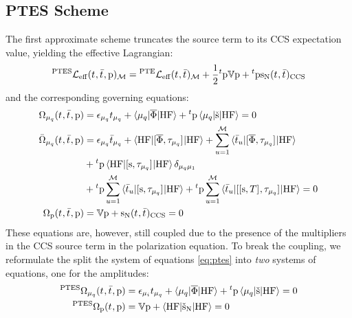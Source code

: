 \subsection*{PTES Scheme}

The first approximate scheme truncates the source term to its
\acrshort{CCS} expectation value, yielding the effective
Lagrangian:\autocite{Caricato2011-tx, Krause2016-ee}
\begin{equation}\label{eq:ptes-cc}
  {}^{\mathrm{PTES}}\mathcal{L}_\mathrm{eff}(t_{}, \bar{t}_{}, \mathrm{p})_\mathcal{M} =
  {}^\mathrm{PTE}\mathcal{L}_\mathrm{eff}(t_{}, \bar{t}_{})_\mathcal{M}
  + \frac{1}{2}{}^t\mathrm{p}\mathbb{V}\mathrm{p} + {}^t\mathrm{p}\mathrm{s}_{\mathrm{N}}(t_{},
  \bar{t}_{})_\mathrm{CCS}
\end{equation}
and the corresponding governing equations:
\begin{subequations}\label{eq:ptes}
  \begin{align}
   \Omega_{\mu_q}(t_{}, \bar{t}_{}, \mathrm{p})  &=
   \epsilon_{\mu_q}t_{\mu_q} + \braket{\mu_q | \overline{\Phi} | \mathrm{HF}}
   + {}^t\mathrm{p}\braket{\mu_q | \check{\mathrm{s}} | \mathrm{HF}}
             = 0 \\
   \bar{\Omega}_{\mu_q}(t_{}, \bar{t}_{}, \mathrm{p})
    &=
    \epsilon_{\mu_q}\bar{t}_{\mu_q} +
    \braket{\mathrm{HF} | [ \overline{\Phi}, \tau_{\mu_q} ]^{} | \mathrm{HF}} +
    \sum_{u=1}^{\mathcal{M}}\braket{\bar{t}_{u} |
    [ \overline{\Phi}, \tau_{\mu_q} ]^{} | \mathrm{HF}}
    \nonumber \\
    &+
    {}^t\mathrm{p}\braket{\mathrm{HF} | [ \mathrm{s}, \tau_{\mu_q} ]^{} | \mathrm{HF}}\delta_{\mu_q\mu_1} \nonumber \\
    &+
    {}^t\mathrm{p}\sum_{u=1}^{\mathcal{M}}\braket{\bar{t}_{u} |
    [ \mathrm{s}, \tau_{\mu_q} ]^{} | \mathrm{HF}}
    +
    {}^t\mathrm{p}\sum_{u=1}^{\mathcal{M}}\braket{\bar{t}_{u} |
    [ [ \mathrm{s}, T ]^{}, \tau_{\mu_q} ]^{} | \mathrm{HF}}
             = 0 \\
    \Omega_{\mathrm{p}}(t_{}, \bar{t}_{}, \mathrm{p})
    &=
    \mathbb{V}\mathrm{p} + \mathrm{s}_{\mathrm{N}}(t_{}, \bar{t}_{})_\mathrm{CCS} = 0
    \label{eq:ptes-cc-polarization-amp}
  \end{align}
\end{subequations}
These equations are, however, still coupled due to the presence of the
multipliers in the \acrshort{CCS} source term in the polarization equation.
To break the coupling, we reformulate the split the system of equations
\eqref{eq:ptes} into \emph{two} systems of equations, one for the
amplitudes:
\begin{subequations}\label{eq:ptes-amp}
  \begin{align}
   {}^{\mathrm{PTES}}\Omega_{\mu_q}(t_{}, \bar{t}_{}, \mathrm{p})  &=
   \epsilon_{\mu_i}t_{\mu_q} + \braket{\mu_q | \overline{\Phi} | \mathrm{HF}}
   + {}^t\mathrm{p}\braket{\mu_q | \check{\mathrm{s}} | \mathrm{HF}}
             = 0 \label{eq:ptes-cc-amplitudes} \\
    {}^{\mathrm{PTES}}\Omega_{\mathrm{p}}(t_{}, \mathrm{p})
    &=
    \mathbb{V}\mathrm{p} +
    \braket{\mathrm{HF} | \check{\mathrm{s}}_{\mathrm{N}} | \mathrm{HF}} = 0
  \end{align}
\end{subequations}
